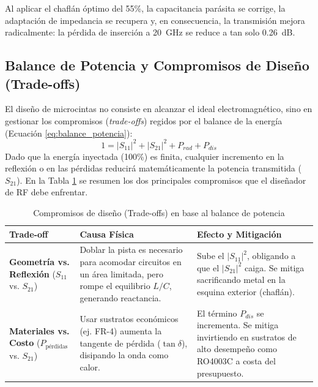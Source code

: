 \documentclass[11pt,letterpaper]{article}
\begin{document}
Al aplicar el chaflán óptimo del 55\%, la capacitancia parásita se corrige, la adaptación de impedancia se recupera y, en consecuencia, la transmisión mejora radicalmente: la pérdida de inserción a \SI{20}{GHz} se reduce a tan solo \SI{0.26}{dB}.

\subsection{Balance de Potencia y Compromisos de Diseño (Trade-offs)}
\label{subsec:balance_tradeoffs}
El diseño de microcintas no consiste en alcanzar el ideal electromagnético, sino en gestionar los compromisos (\textit{trade-offs}) regidos por el balance de la energía (Ecuación \ref{eq:balance_potencia}):
\begin{equation}
    1 = |S_{11}|^2 + |S_{21}|^2 + P_{rad} + P_{dis}
    \label{eq:balance_potencia}
\end{equation}
Dado que la energía inyectada (100\%) es finita, cualquier incremento en la reflexión o en las pérdidas reducirá matemáticamente la potencia transmitida ($S_{21}$). En la Tabla \ref{tab:tradeoffs} se resumen los dos principales compromisos que el diseñador de RF debe enfrentar.

\begin{table}[htpb]
    \centering
    \caption{Compromisos de diseño (Trade-offs) en base al balance de potencia}
    \label{tab:tradeoffs}
    \renewcommand{\arraystretch}{1.3}
    \begin{tabular}{p{4cm} p{5.5cm} p{5.5cm}}
        \toprule
        \textbf{Trade-off} & \textbf{Causa Física} & \textbf{Efecto y Mitigación} \\
        \midrule
        \textbf{Geometría vs. Reflexión} \newline ($S_{11}$ vs. $S_{21}$) & Doblar la pista es necesario para acomodar circuitos en un área limitada, pero rompe el equilibrio $L/C$, generando reactancia. & Sube el $|S_{11}|^2$, obligando a que el $|S_{21}|^2$ caiga. Se mitiga sacrificando metal en la esquina exterior (chaflán). \\
        \textbf{Materiales vs. Costo} \newline ($P_{\text{pérdidas}}$ vs. $S_{21}$) & Usar sustratos económicos (ej. FR-4) aumenta la tangente de pérdida ($\tan\delta$), disipando la onda como calor. & El término $P_{dis}$ se incrementa. Se mitiga invirtiendo en sustratos de alto desempeño como RO4003C a costa del presupuesto. \\
        \bottomrule
    \end{tabular}
\end{table}
\end{document}
